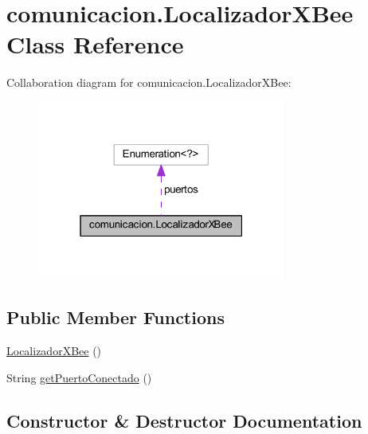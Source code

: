 \hypertarget{classcomunicacion_1_1_localizador_x_bee}{}\section{comunicacion.\+Localizador\+X\+Bee Class Reference}
\label{classcomunicacion_1_1_localizador_x_bee}


Collaboration diagram for comunicacion.\+Localizador\+X\+Bee\+:
\nopagebreak
\begin{figure}[H]
\begin{center}
\leavevmode
\includegraphics[width=232pt]{classcomunicacion_1_1_localizador_x_bee__coll__graph}
\end{center}
\end{figure}
\subsection*{Public Member Functions}
\begin{DoxyCompactItemize}
\item 
\mbox{\hyperlink{classcomunicacion_1_1_localizador_x_bee_a246b19fa74260ff10007ec9965e4af5e}{Localizador\+X\+Bee}} ()
\item 
String \mbox{\hyperlink{classcomunicacion_1_1_localizador_x_bee_a1c4e579949b66e7b134f31779b326ff3}{get\+Puerto\+Conectado}} ()
\end{DoxyCompactItemize}


\subsection{Constructor \& Destructor Documentation}
\mbox{\label{classcomunicacion_1_1_localizador_x_bee_a246b19fa74260ff10007ec9965e4af5e}} 
